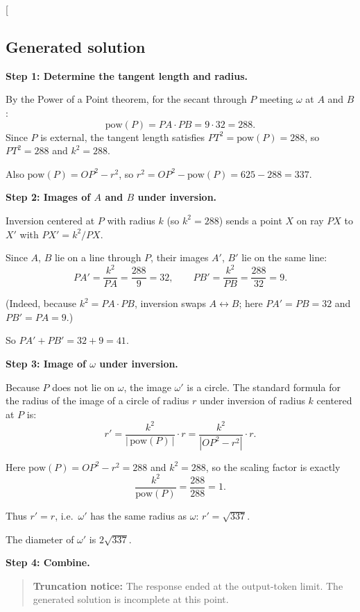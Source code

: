 \documentclass[
  11pt,
  letterpaper,
]{article}
\begin{document}
{[}\boxed{73}{]}

\subsection{Generated solution}\label{generated-solution-12}

\textbf{Step 1: Determine the tangent length and radius.}

By the Power of a Point theorem, for the secant through \(P\) meeting
\(\omega\) at \(A\) and \(B\):
\[\text{pow}(P) = PA \cdot PB = 9 \cdot 32 = 288.\] Since \(P\) is
external, the tangent length satisfies \(PT^2 = \text{pow}(P) = 288\),
so \(PT^2 = 288\) and \(k^2 = 288\).

Also \(\text{pow}(P) = OP^2 - r^2\), so
\(r^2 = OP^2 - \text{pow}(P) = 625 - 288 = 337\).

\textbf{Step 2: Images of \(A\) and \(B\) under inversion.}

Inversion centered at \(P\) with radius \(k\) (so \(k^2 = 288\)) sends a
point \(X\) on ray \(PX\) to \(X'\) with \(PX' = k^2 / PX\).

Since \(A\), \(B\) lie on a line through \(P\), their images \(A'\),
\(B'\) lie on the same line:
\[PA' = \frac{k^2}{PA} = \frac{288}{9} = 32, \qquad PB' = \frac{k^2}{PB} = \frac{288}{32} = 9.\]

(Indeed, because \(k^2 = PA \cdot PB\), inversion swaps
\(A \leftrightarrow B\); here \(PA' = PB = 32\) and \(PB' = PA = 9\).)

So \(PA' + PB' = 32 + 9 = 41\).

\textbf{Step 3: Image of \(\omega\) under inversion.}

Because \(P\) does not lie on \(\omega\), the image \(\omega'\) is a
circle. The standard formula for the radius of the image of a circle of
radius \(r\) under inversion of radius \(k\) centered at \(P\) is:
\[r' = \frac{k^2}{|\,\text{pow}(P)\,|} \cdot r = \frac{k^2}{|OP^2 - r^2|} \cdot r.\]

Here \(\text{pow}(P) = OP^2 - r^2 = 288\) and \(k^2 = 288\), so the
scaling factor is exactly
\[\frac{k^2}{\text{pow}(P)} = \frac{288}{288} = 1.\]

Thus \(r' = r\), i.e.~\(\omega'\) has the same radius as \(\omega\):
\(r' = \sqrt{337}\).

The diameter of \(\omega'\) is \(2\sqrt{337}\).

\textbf{Step 4: Combine.}

\begin{quote}
\textbf{Truncation notice:} The response ended at the output-token
limit. The generated solution is incomplete at this point.
\end{quote}
\end{document}
